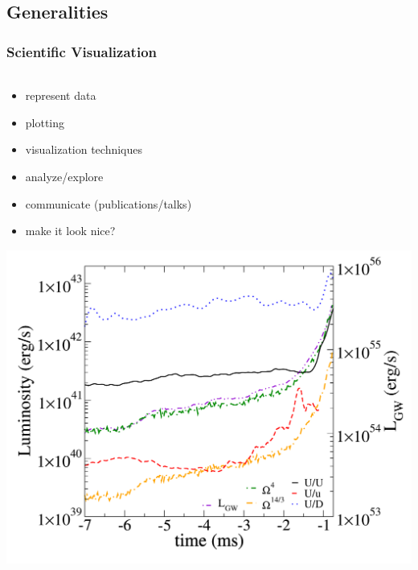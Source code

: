 \subsection{Generalities}
\begin{frame}
    \frametitle{Scientific Visualization}
    \framesubtitle{}

    \vspace{-2.5mm}
    \begin{columns} %
    \begin{column}{5.325cm}
        \begin{itemize}
                \item represent data
                \item plotting
                \item visualization techniques
                \item analyze/explore
                \item communicate (publications/talks)
                \item make it look nice?
        \end{itemize}

        \centering
        \includegraphics[width=.5\columnwidth]{figs/plots/mpc/figure3_B}


\end{column}
\end{columns}
\end{frame}
